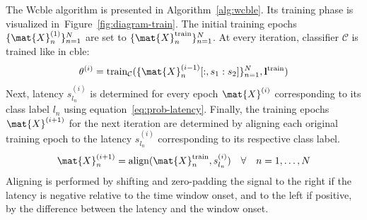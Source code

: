 The W\ac{cble} algorithm is presented in Algorithm~\ref{alg:wcble}.
Its training phase is visualized in~Figure~\ref{fig:diagram-train}.
The initial training epochs $\{\mat{X}_n^{(1)}\}_{n=1}^N$ are set to $\{\mat{X}_n^\mathrm{train}\}_{n=1}^N$.
At every iteration, classifier $\mathcal{C}$ is trained like in \ac{cble}:
\begin{equation}
  \theta^{(i)} =
  \mathrm{train}_\mathcal{C}(\{\mat{X}^{(i-1)}_n[:,s_1:s_2]\}_{n=1}^N,\mathbf{l}^\mathrm{train})
\end{equation}
Next, latency $s_{l_n}^{(i)}$ is determined for every epoch $\mat{X}^{(i)}$ corresponding
to its class label $l_n$ using equation~\ref{eq:prob-latency}.
Finally, the training epochs $\mat{X}^{(i+1)}$ for the next iteration are determined by aligning
each original training epoch to the latency $s_{l_n}^{(i)}$ corresponding to its respective class
label.
\begin{equation}
  \mat{X}^{(i+1)}_n = \mathrm{align}(\mat{X}_n^\mathrm{train}, s_{l_n}^{(i)}) \quad \forall \quad n=1,\ldots,N
\end{equation}
Aligning is performed by shifting and zero-padding the signal to the right if
the latency is negative relative to the time window onset, and to the left if
positive, by the difference between the latency and the window onset.
